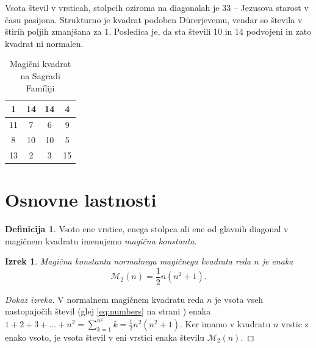 \documentclass[a4paper,12pt]{article}
\newcommand{\m}{\mathcal{M}_2}
\newcommand{\pojem}[1]{\emph{\color{purple}#1}}
\newenvironment{dokaz}
{\begin{proof}[Dokaz izreka]}
   {\end{proof}}
\newenvironment{magic}[3]
{
   \begin{table}[!ht]
   \centering
   \caption{#2}
   \label{#3}
   \large
   \begin{tabular}{|*{#1}{c|}}
   \hline
}
{
   \end{tabular}
    \normalsize
\end{table}
}
\theoremstyle{definition}
\newtheorem{definicija}{Definicija}
\theoremstyle{plain}
\newtheorem{izrek}{Izrek}
\begin{document}
Vsota števil v vrsticah, stolpcih oziroma na diagonalah je 33 -- Jezusova starost
v času pasijona. Strukturno je kvadrat podoben Dürerjevemu, vendar so števila
v štirih poljih zmanjšana za 1. Posledica je, da sta števili 10 in 14 podvojeni
in zato kvadrat ni normalen.
%
\begin{magic}{4}{Magični kvadrat na Sagradi Famíliji}{table:sagrada}
  1 & 14 & 14 &  4 \\\hline
  11 &  7 &  6 &  9 \\\hline
  8 & 10 & 10 &  5 \\\hline
  13 &  2 &  3 & 15 \\\hline
   \end{magic}


\section{Osnovne lastnosti}

\begin{definicija}
   Vsoto ene vrstice, enega stolpca ali ene od glavnih diagonal
   v magičnem kvadratu imenujemo \pojem{magična konstanta}.
\end{definicija}

\begin{izrek}
   Magična konstanta normalnega magičnega kvadrata reda \(n\)
   je enaka
   \begin{equation}
      \label{eq:mc}
      \m(n) = \frac{1}{2} n(n^2+1).
   \end{equation}
\end{izrek}

\begin{dokaz}
   V normalnem magičnem kvadratu reda \(n\) je vsota vseh nastopajočih
   števil (glej \eqref{eq:numbers} na strani \pageref{eq:numbers}) enaka
   \(1+2+3+\ldots+n^2=\sum_{k=1}^{n^2}k=\frac{1}{2}n^2(n^2+1)\). Ker imamo
   v kvadratu \(n\) vrstic z enako vsoto, je vsota števil v eni vrstici
   enaka številu \(\m(n)\).
\end{dokaz}
\end{document}
